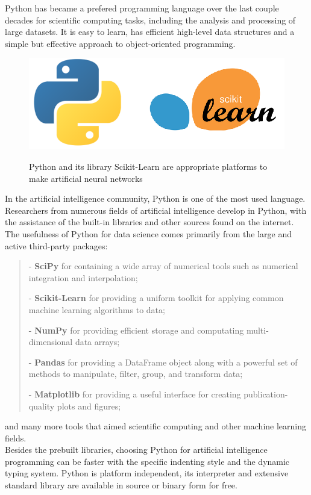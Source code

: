 Python has became a prefered programming language over the last couple decades for scientific computing tasks, including the analysis and processing of large datasets. It is easy to learn, has efficient high-level data structures and a simple but effective approach to object-oriented programming.

\begin{figure}[h]
	\centering
	\caption{Python and its library Scikit-Learn are appropriate platforms to make artificial neural networks}
	\includegraphics[height=0.25\linewidth]{./figures/python_scikit}
	\label{fig:python_scikit}
\end{figure}

In the artificial intelligence community, Python is one of the most used language. Researchers from numerous fields of artificial intelligence  develop in Python, with the assistance of the built-in libraries and other sources found on the internet. The usefulness of Python for data science comes primarily from the large and active third-party packages: 
\begin{verse}
	- \textbf{SciPy} for containing a wide array of numerical tools such as numerical integration and interpolation;
	
	- \textbf{Scikit-Learn} for providing a uniform toolkit for applying common machine learning algorithms to data;
	
	- \textbf{NumPy} for providing efficient storage and computating multi-dimensional data arrays;
	
	-  \textbf{Pandas} for providing a DataFrame object along with a powerful set of methods to manipulate, filter, group, and transform data; 
	
	- \textbf{Matplotlib} for providing a useful interface for creating publication-quality plots and figures;
\end{verse} 
and many more tools that aimed scientific computing and other machine learning fields.\\ 
Besides the prebuilt libraries, choosing Python for artificial intelligence programming can be faster with the specific indenting style and the dynamic typing system. Python is platform independent, its interpreter and extensive standard library are available in source or binary form for free.
